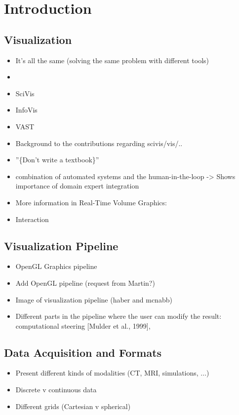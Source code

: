 \chapter{Introduction}
\label{cha:introduction}

\section{Visualization}
\begin{itemize}
\item It's all the same (solving the same problem with different tools) \item \cite{card1999readings} \cite{tory2002model}
\item SciVis
\item InfoVis
\item VAST
\item Background to the contributions regarding scivis/vis/..
\item ''\{Don't write a textbook\}''
\item combination of automated systems and the human-in-the-loop \cite{munzner2014visualization} \cite{van2005value} -> Shows importance of domain expert integration
\item More information in Real-Time Volume Graphics: \cite{engel2006real}
\item Interaction
\end{itemize}

\section{Visualization Pipeline}
\begin{itemize}
\item OpenGL Graphics pipeline \cite{segal2016opengl}
\item Add OpenGL pipeline (request from Martin?)
\item Image of visualization pipeline (haber and mcnabb)
\item Different parts in the pipeline where the user can modify the result: computational steering [Mulder et al., 1999],
\end{itemize}

\section{Data Acquisition and Formats}
\begin{itemize}
\item Present different kinds of modalities (CT, MRI, simulations, ...)
\item Discrete v continuous data \cite{tory2002model}
\item Different grids (Cartesian v spherical)
\end{itemize}

